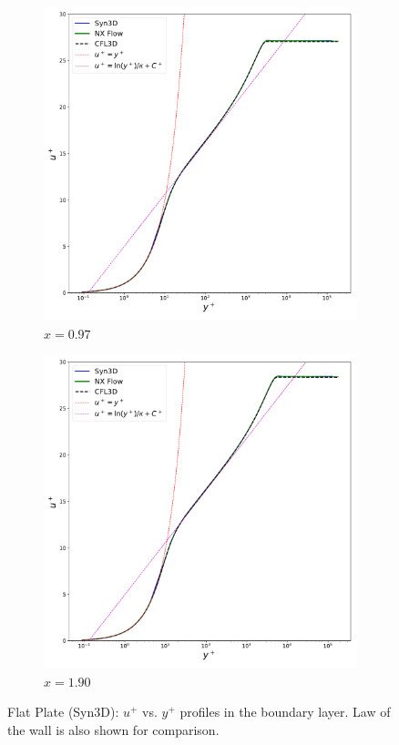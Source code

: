 \begin{figure}[ht!]
\centering
\begin{subfigure}{.45\textwidth}
  \centering
  \includegraphics[width=1.0\textwidth]{figs/flat/uplus_yplus_097.pdf}
  \caption{$x=0.97$}
\end{subfigure}%
\begin{subfigure}{.45\textwidth}
  \centering
  \includegraphics[width=1.0\textwidth]{figs/flat/uplus_yplus_190.pdf}
  \caption{$x=1.90$}
\end{subfigure}
\caption{Flat Plate (Syn3D): $u^+$ vs. $y^+$ profiles in the boundary layer. Law of the wall is also shown for comparison.}
\label{fig:synflatupyp}
\end{figure}

